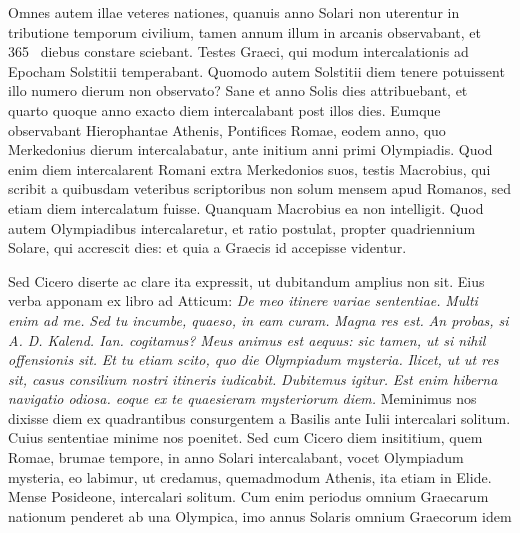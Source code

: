 Omnes autem illae veteres nationes,
quanuis anno Solari non uterentur in tributione temporum civilium,
tamen annum illum in arcanis observabant, et 365~ diebus constare
sciebant.
Testes Graeci, qui modum intercalationis ad Epocham
Solstitii temperabant.
Quomodo autem Solstitii diem tenere potuissent
illo numero dierum non observato?
Sane et anno Solis dies
 attribuebant, et quarto quoque anno exacto diem intercalabant
post  illos dies.
Eumque observabant Hierophantae
Athenis, Pontifices Romae, eodem anno, quo Merkedonius 
dierum intercalabatur, ante initium anni primi Olympiadis.
Quod
enim diem intercalarent Romani extra Merkedonios suos, testis Macrobius,
qui scribit a quibusdam veteribus scriptoribus non solum
mensem apud Romanos, sed etiam diem intercalatum fuisse.
Quanquam
Macrobius ea non intelligit.
Quod autem Olympiadibus
intercalaretur, et ratio postulat, propter quadriennium Solare, qui accrescit
dies: et quia a Graecis id accepisse videntur.
\begin{table}[tbp]
  
\end{table}
%
Sed Cicero diserte
ac clare ita expressit, ut dubitandum amplius non sit.
Eius verba
apponam ex libro  ad Atticum:
 \textit{De meo itinere variae sententiae.}
\textit{Multi enim ad me.}
\textit{Sed tu incumbe, quaeso, in eam curam.}
\textit{Magna
res est.}
\textit{An probas, si A. D. Kalend. Ian. cogitamus?} %
\textit{Meus animus
est aequus: sic tamen, ut si nihil offensionis sit.}
\textit{Et tu etiam scito, quo
die Olympiadum mysteria.}
\textit{Ilicet, ut ut res sit, casus consilium nostri
itineris iudicabit.}
\textit{Dubitemus igitur.}
\textit{Est enim hiberna navigatio
odiosa. eoque ex te quaesieram mysteriorum diem.}
Meminimus nos dixisse
diem ex quadrantibus consurgentem a Basilis ante  Iulii intercalari
solitum.
Cuius sententiae minime nos poenitet.
Sed cum Cicero diem
insititium, quem Romae, brumae tempore, in anno Solari intercalabant,
vocet Olympiadum mysteria, eo labimur, ut credamus, quemadmodum
Athenis, ita etiam in Elide.
%
Mense Posideone, intercalari solitum.
Cum enim periodus omnium Graecarum nationum penderet
ab una Olympica, imo annus Solaris omnium Graecorum idem

